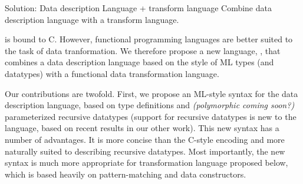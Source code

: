 
Solution: Data description Language + transform language
Combine data description language with a transform language.

\pads{} is bound to C. However, functional programming languages are
better suited to the task of data tranformation. We therefore propose
a new language, \datatype{}, that combines a data description language
based on the style of ML types (and datatypes) with a functional data
transformation language. 

Our contributions are twofold. First, we propose an ML-style syntax
for the \pads{} data description language, based on type definitions
and {\em(polymorphic coming soon?)} parameterized recursive datatypes
(support for recursive datatypes is new to the \pads{} language, based
on recent results in our other work). This new syntax has a number of
advantages. It is more concise than the C-style encoding and more
naturally suited to describing recursive datatypes. Most importantly,
the new syntax is much more appropriate for transformation language
proposed below, which is based heavily on pattern-matching and data
constructors.

